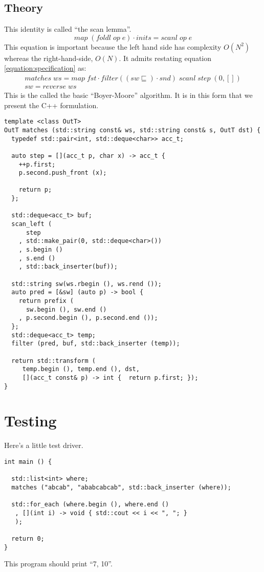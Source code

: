 \documentclass{article}
\begin{document}
\subsection{Theory}
This identity is called ``the scan lemma''.
\begin{equation}
map\;(foldl\;op\;e) \cdot inits = scanl\;op\;e
\end{equation}
This equation is important because the left hand side has complexity
\(O(N^{2})\) whereas the right-hand-side, \(O(N)\). It admits
restating equation \ref{equation:specification} as:
\begin{gather}
matches\;ws = map\;fst \cdot filter ((sw \sqsubseteq) \cdot snd)\;scanl\; step\;(0, []) \nonumber\\
sw = reverse\;ws
\end{gather}
This is the called the basic ``Boyer-Moore'' algorithm. It is in this
form that we present the C++ formulation.
\begin{verbatim}
template <class OutT>
OutT matches (std::string const& ws, std::string const& s, OutT dst) {
  typedef std::pair<int, std::deque<char>> acc_t;

  auto step = [](acc_t p, char x) -> acc_t {
    ++p.first;
    p.second.push_front (x);

    return p;
  };

  std::deque<acc_t> buf;
  scan_left (
      step
    , std::make_pair(0, std::deque<char>())
    , s.begin ()
    , s.end ()
    , std::back_inserter(buf));

  std::string sw(ws.rbegin (), ws.rend ());
  auto pred = [&sw] (auto p) -> bool { 
    return prefix (
      sw.begin (), sw.end ()
    , p.second.begin (), p.second.end ()); 
  };
  std::deque<acc_t> temp;
  filter (pred, buf, std::back_inserter (temp));

  return std::transform (
     temp.begin (), temp.end (), dst, 
     [](acc_t const& p) -> int {  return p.first; });
}
\end{verbatim}
\section{Testing}
Here's a little test driver.
\begin{verbatim}
int main () {

  std::list<int> where;
  matches ("abcab", "ababcabcab", std::back_inserter (where));

  std::for_each (where.begin (), where.end ()
   , [](int i) -> void { std::cout << i << ", "; }
   );  

  return 0;
}
\end{verbatim}
This program should print ``7, 10''.
\end{document}
